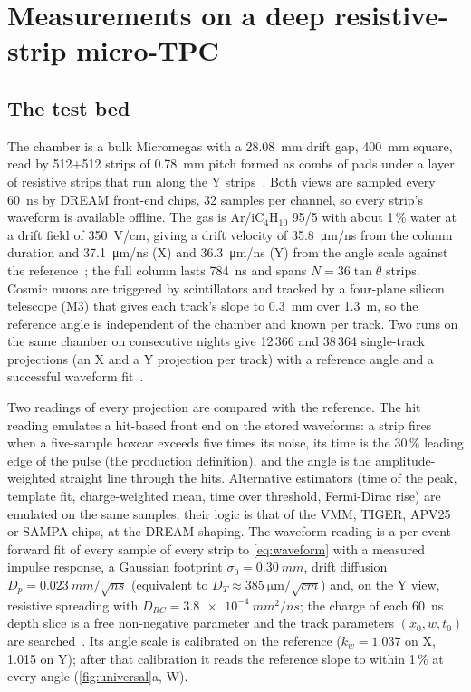 \section{Measurements on a deep resistive-strip micro-TPC}\label{sec:measurements}

\subsection{The test bed}

The chamber is a bulk Micromegas with a \SI{28.08}{mm} drift gap, 400~mm square, read by 512+512 strips of \SI{0.78}{mm}
pitch formed as combs of pads under a layer of resistive strips that run along the Y strips~\cite{paperI}. Both views are
sampled every \SI{60}{ns} by DREAM front-end chips, 32 samples per channel, so every strip's waveform is available offline. The
gas is Ar/iC$_4$H$_{10}$ 95/5 with about 1\,\% water at a drift field of \SI{350}{V/cm}, giving a drift velocity of
\SI{35.8}{\micro\metre/ns} from the column duration and \SI{37.1}{\micro\metre/ns} (X) and \SI{36.3}{\micro\metre/ns} (Y) from the
angle scale against the reference~\cite{paperI}; the full column lasts \SI{784}{ns} and spans $N = 36\tan\theta$ strips. Cosmic
muons are triggered by scintillators and tracked by a four-plane silicon telescope (M3) that gives each track's slope to
\SI{0.3}{mm} over \SI{1.3}{m}, so the reference angle is independent of the chamber and known per track. Two runs on the same
chamber on consecutive nights give 12\,366 and 38\,364 single-track projections (an X and a Y projection per track) with a
reference angle and a successful waveform fit~\cite{paperII}.

Two readings of every projection are compared with the reference. The hit reading emulates a hit-based front end on the
stored waveforms: a strip fires when a five-sample boxcar exceeds five times its noise, its time is the 30\,\% leading edge of
the pulse (the production definition), and the angle is the amplitude-weighted straight line through the hits. Alternative
estimators (time of the peak, template fit, charge-weighted mean, time over threshold, Fermi-Dirac rise) are emulated on the
same samples; their logic is that of the VMM, TIGER, APV25 or SAMPA chips, at the DREAM shaping. The waveform reading is a
per-event forward fit of every sample of every strip to \cref{eq:waveform} with a measured impulse response, a Gaussian
footprint $\sigma_0 = \SI{0.30}{mm}$, drift diffusion $D_p = \SI{0.023}{mm/\sqrt{ns}}$ (equivalent to
$D_T \approx \SI{385}{\micro\metre\per\sqrt{cm}}$) and, on the Y view, resistive spreading with $D_{RC} = \SI{3.8e-4}{mm^2/ns}$; the
charge of each \SI{60}{ns} depth slice is a free non-negative parameter and the track parameters $(x_0, w, t_0)$ are
searched~\cite{paperII}. Its angle scale is calibrated on the reference ($k_w = 1.037$ on X, 1.015 on Y); after that calibration
it reads the reference slope to within 1\,\% at every angle (\cref{fig:universal}a, W).

